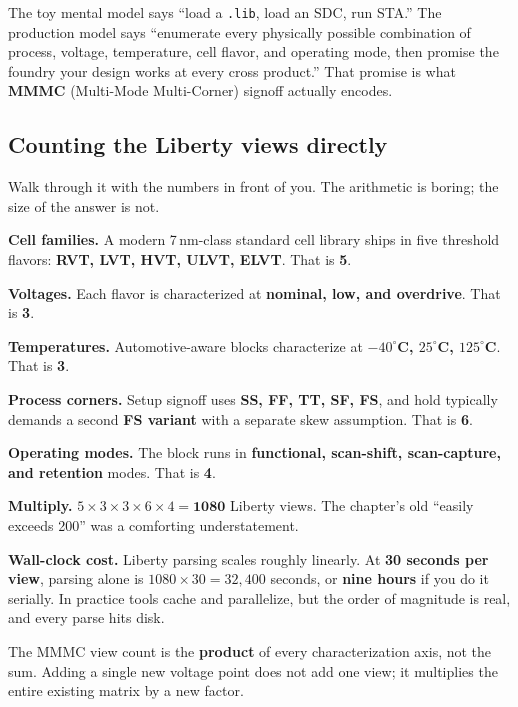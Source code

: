 The toy mental model says ``load a \texttt{.lib}, load an SDC, run STA.'' The production model says ``enumerate every physically possible combination of process, voltage, temperature, cell flavor, and operating mode, then promise the foundry your design works at every cross product.'' That promise is what \textbf{MMMC} (Multi-Mode Multi-Corner) signoff actually encodes.

\subsection{Counting the Liberty views directly}

Walk through it with the numbers in front of you. The arithmetic is boring; the size of the answer is not.

 \textbf{Cell families.} A modern 7\,nm-class standard cell library ships in five threshold flavors: \textbf{RVT, LVT, HVT, ULVT, ELVT}. That is \textbf{5}.

 \textbf{Voltages.} Each flavor is characterized at \textbf{nominal, low, and overdrive}. That is \textbf{3}.

 \textbf{Temperatures.} Automotive-aware blocks characterize at \textbf{$-40^\circ$C, $25^\circ$C, $125^\circ$C}. That is \textbf{3}.

 \textbf{Process corners.} Setup signoff uses \textbf{SS, FF, TT, SF, FS}, and hold typically demands a second \textbf{FS variant} with a separate skew assumption. That is \textbf{6}.

 \textbf{Operating modes.} The block runs in \textbf{functional, scan-shift, scan-capture, and retention} modes. That is \textbf{4}.

 \textbf{Multiply.} $5 \times 3 \times 3 \times 6 \times 4 = \mathbf{1080}$ Liberty views. The chapter's old ``easily exceeds 200'' was a comforting understatement.

 \textbf{Wall-clock cost.} Liberty parsing scales roughly linearly. At \textbf{30 seconds per view}, parsing alone is $1080 \times 30 = 32{,}400$ seconds, or \textbf{nine hours} if you do it serially. In practice tools cache and parallelize, but the order of magnitude is real, and every parse hits disk.

\begin{keyidea}
The MMMC view count is the \textbf{product} of every characterization axis, not the sum. Adding a single new voltage point does not add one view; it multiplies the entire existing matrix by a new factor.
\end{keyidea}

